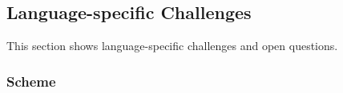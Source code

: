 





% 


\subsection{Language-specific Challenges}

This section shows language-specific challenges and open questions.


\subsubsection{Scheme}

